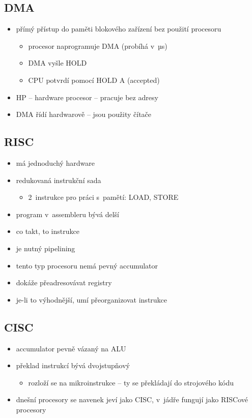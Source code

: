 \documentclass[a4paper,12pt]{article}
\providecommand{\tightlist}{%
\setlength{\itemsep}{0pt}\setlength{\parskip}{0pt}}
\begin{document}
\subsection{DMA}

\begin{itemize}
\tightlist
\item přímý přístup do paměti blokového zařízení bez použití procesoru

  \begin{itemize}
  \tightlist
  \item procesor naprogramuje DMA (probíhá v~µs)
  \item DMA vyšle HOLD
  \item CPU potvrdí pomocí HOLD A (accepted)
  \end{itemize}
\item HP -- hardware procesor -- pracuje bez adresy
\item DMA řídí hardwarově -- jsou použity čítače
\end{itemize}

\subsection{RISC}

\begin{itemize}
\tightlist
\item má jednoduchý hardware
\item redukovaná instrukční sada

  \begin{itemize}
  \tightlist
  \item 2~instrukce pro práci s~pamětí: LOAD, STORE
  \end{itemize}
\item program v~assembleru bývá delší
\item co takt, to instrukce
\item je nutný pipelining
\item tento typ procesoru nemá pevný accumulator
\item dokáže přeadresovávat registry
\item je-li to výhodnější, umí přeorganizovat instrukce
\end{itemize}

\subsection{CISC}

\begin{itemize}
\tightlist
\item accumulator pevně vázaný na ALU
\item překlad instrukcí bývá dvojstupňový

  \begin{itemize}
  \tightlist
  \item rozloží se na mikroinstrukce -- ty se překládají do strojového kódu
  \end{itemize}
\item dnešní procesory se navenek jeví jako CISC, v~jádře fungují jako
  RISCové procesory
\end{itemize}
\end{document}
